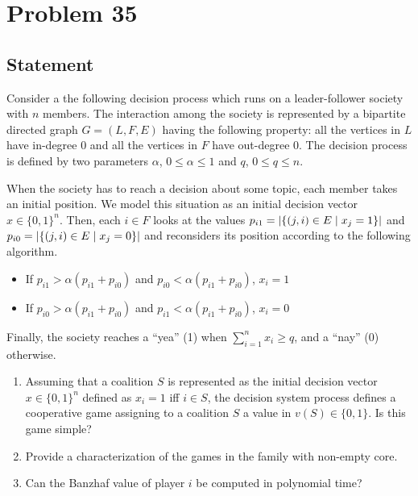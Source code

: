 \documentclass[a4paper, 11pt]{article}
\newcommand{\onemm}[0]{\hspace{1mm}}
\newcommand{\suchthat}[0]{\onemm|\onemm}
\begin{document}
\section*{Problem 35}
{\color{statement}
\subsection*{Statement}
Consider a the following decision process which runs on a leader-follower society with $n$ members. The interaction among the society is represented by a bipartite directed graph $G = (L,F,E)$ having the following property: all the vertices in $L$ have in-degree 0 and all the vertices in $F$ have out-degree 0. The decision process is defined by two parameters $\alpha$, $0 \leq \alpha \leq 1$ and $q$, $0 \leq q \leq n$.

When the society has to reach a decision about some topic, each member takes an initial position. We model this situation as an initial decision vector $x \in \{0, 1\}^n$. Then, each $i \in F$ looks at the values $p_{i1} =|\{(j,i) \in E \suchthat x_j = 1\}|$ and $p_{i0} = |\{(j,i) \in E \suchthat x_j = 0\}|$ and reconsiders its position according to the following algorithm.

\begin{itemize}
    \item If $p_{i1} > \alpha(p_{i1}+p_{i0})$ and $p_{i0} < \alpha(p_{i1}+p_{i0})$, $x_i =1$
    \item If $p_{i0} > \alpha(p_{i1}+p_{i0})$ and $p_{i1} < \alpha(p_{i1}+p_{i0})$, $x_i =0$
\end{itemize}

Finally, the society reaches a ``yea'' (1) when $\sum^n_{i=1} x_i \geq q$, and a ``nay'' (0) otherwise.
\begin{enumerate}[label=(\alph*)]
    \item Assuming that a coalition $S$ is represented as the initial decision vector $x \in \{0,1\}^n$ defined as $x_i = 1$ iff $i \in S$, the decision system process defines a cooperative game assigning to a coalition $S$ a value in $v(S) \in \{0, 1\}$. Is this game simple?
    \item Provide a characterization of the games in the family with non-empty core.
    \item Can the Banzhaf value of player $i$ be computed in polynomial time?
\end{enumerate}
}
\end{document}
